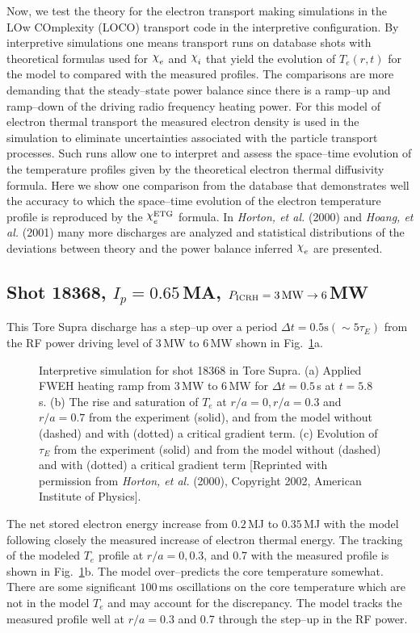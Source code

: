 \documentclass[a4paper,openany,12pt]{book}
\def\chix{\raise.5ex\hbox{$\chi$}}
\begin{document}
Now, we test the theory for the electron transport making simulations in the LOw COmplexity (LOCO) transport code in the interpretive configuration. By interpretive simulations one means transport runs on database shots with theoretical formulas used for $\chix_e$ and $\chix_i$ that yield the evolution of $T_e(r, t)$ for the model to compared with the measured profiles. The comparisons are more demanding that the steady--state power balance since there is a ramp--up and ramp--down of the driving radio frequency heating power. For this model of electron thermal transport the measured electron density is used in the simulation to eliminate uncertainties associated with the particle transport processes. Such runs allow one to interpret and assess the space--time evolution of the temperature profiles given by the theoretical electron thermal diffusivity formula. Here we show one comparison from the database that demonstrates well the accuracy to which the space--time evolution of the electron temperature profile is reproduced by the $\chix_e^{\rm ETG}$ formula. In \emph{Horton, et al.} (2000) and \emph{Hoang, et al.} (2001) many more discharges are analyzed and statistical distributions of the deviations between theory and the power balance inferred $\chix_e$ are presented.

\subsection*{Shot 18368, $I_p=0.65\,$MA, $P_{\rm ICRH}=3\,\rm MW\to 6\,$MW}

This Tore Supra discharge has a step--up over a period $\Delta t=0.5\mathrm{s}(\sim 5\tau_E)$ from the RF power driving level of $3\,$MW to $6\,$MW shown in Fig.~\ref{F9.10}a. 
%
\begin{figure}[H]
\centerline{}
\caption{Interpretive simulation for shot 18368 in Tore Supra. (a) Applied FWEH heating ramp from $3\,$MW to $6\,$MW for $\Delta t=0.5\,$s at $t=5.8\,$s. (b) The rise and saturation of $T_e$ at $r/a=0, r/a=0.3$ and $r/a=0.7$ from the experiment (solid), and from the model without (dashed) and with (dotted) a critical gradient term. (c) Evolution of $\tau_E$ from the experiment (solid) and from the model without (dashed) and with (dotted) a critical gradient term [Reprinted with permission from \emph{Horton, et al.} (2000), Copyright 2002, American Institute of Physics].}
\label{F9.10}
\end{figure}
%
The net stored electron energy increase from $0.2\,$MJ to $0.35\,$MJ with the model following closely the measured increase of electron thermal energy. The tracking of the modeled $T_e$ profile at $r/a=0,0.3$, and 0.7 with the measured profile is shown in Fig.~\ref{F9.10}b. The model over--predicts the core temperature somewhat. There are some significant $100\,$ms oscillations on the core temperature which are not in the model $T_e$ and may account for the discrepancy. The model tracks the measured profile well at $r/a=0.3$ and 0.7 through the step--up in the RF power.
\end{document}

